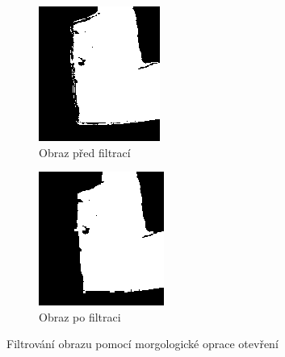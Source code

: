 \documentclass[twoside]{ctuthesis}
\begin{document}
\begin{figure}
    \centering
    \begin{subfigure}{0.5\textwidth}
      \centering
      \includegraphics[width=0.93\linewidth]{pictures/before_open.png}
      \caption{Obraz před filtrací}
      \label{subfig:pic_close}
    \end{subfigure}
    \begin{subfigure}{0.49\textwidth}
      \centering
      \includegraphics[width=0.99\linewidth]{pictures/after_open.png}
      \caption{Obraz po filtraci}
      \label{subfig:pic_open}
    \end{subfigure}
    \caption{Filtrování obrazu pomocí morgologické oprace otevření}
    \label{fig:morfology_open}
\end{figure}
\end{document}
